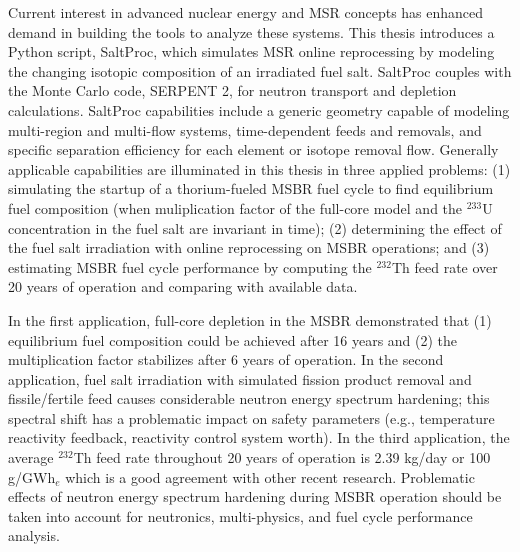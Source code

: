 \vspace{-0.2in}
Current interest in advanced nuclear energy and \gls{MSR} concepts has enhanced demand in building the tools to analyze these systems. This thesis introduces a Python script, SaltProc, which simulates \gls{MSR} online reprocessing by modeling the changing isotopic composition of an irradiated fuel salt. SaltProc couples with the Monte Carlo code, SERPENT 2, for neutron transport and depletion calculations. SaltProc capabilities include a generic geometry capable of modeling multi-region and multi-flow systems, time-dependent feeds and removals, and specific separation efficiency for each element or isotope removal flow. Generally applicable  capabilities are illuminated in this thesis in three applied problems: (1) simulating the startup of a thorium-fueled \gls{MSBR} fuel cycle to find equilibrium fuel composition (when muliplication factor of the full-core model and the $^{233}$U concentration in the fuel salt are invariant in time); (2) determining the effect of the fuel salt irradiation with online reprocessing on \gls{MSBR} operations; and (3) estimating \gls{MSBR} fuel cycle performance by computing the $^{232}$Th feed rate over 20 years of operation and comparing with available data.

In the first application, full-core depletion in the \gls{MSBR} demonstrated that (1) equilibrium fuel composition could be achieved after 16 years and (2) the multiplication factor stabilizes after 6 years of operation. In the second application, fuel salt irradiation with simulated fission product removal and fissile/fertile feed causes considerable neutron energy spectrum hardening; this spectral shift has a problematic impact on safety parameters (e.g., temperature reactivity feedback, reactivity control system worth). In the third application, the average $^{232}$Th feed rate throughout 20 years of operation is 2.39 kg/day or 100 g/GWh$_e$ which is a good agreement with other recent research. Problematic effects of neutron energy spectrum hardening during \gls{MSBR} operation should be taken into account for neutronics, multi-physics, and fuel cycle performance analysis.
